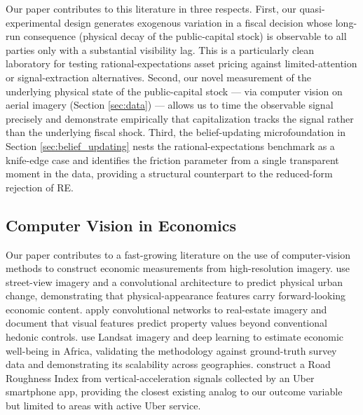 Our paper contributes to this literature in three respects. First, our quasi-experimental design generates exogenous variation in a fiscal decision whose long-run consequence (physical decay of the public-capital stock) is observable to all parties only with a substantial visibility lag. This is a particularly clean laboratory for testing rational-expectations asset pricing against limited-attention or signal-extraction alternatives. Second, our novel measurement of the underlying physical state of the public-capital stock --- via computer vision on aerial imagery (Section \ref{sec:data}) --- allows us to time the observable signal precisely and demonstrate empirically that capitalization tracks the signal rather than the underlying fiscal shock. Third, the belief-updating microfoundation in Section \ref{sec:belief_updating} nests the rational-expectations benchmark as a knife-edge case and identifies the friction parameter from a single transparent moment in the data, providing a structural counterpart to the reduced-form rejection of RE.

\subsection*{Computer Vision in Economics}

Our paper contributes to a fast-growing literature on the use of computer-vision methods to construct economic measurements from high-resolution imagery. \citet{naik2017computer} use street-view imagery and a convolutional architecture to predict physical urban change, demonstrating that physical-appearance features carry forward-looking economic content. \citet{glaeser2018computervision} apply convolutional networks to real-estate imagery and document that visual features predict property values beyond conventional hedonic controls. \citet{yeh2020satellite} use Landsat imagery and deep learning to estimate economic well-being in Africa, validating the methodology against ground-truth survey data and demonstrating its scalability across geographies. \citet{currier2023} construct a Road Roughness Index from vertical-acceleration signals collected by an Uber smartphone app, providing the closest existing analog to our outcome variable but limited to areas with active Uber service.

